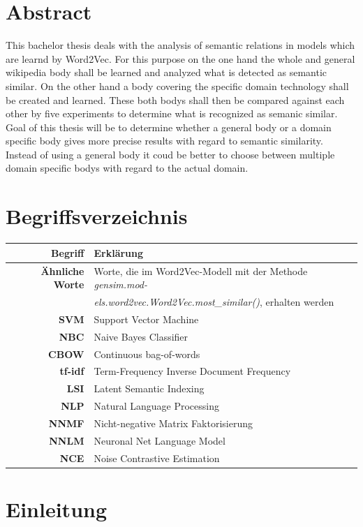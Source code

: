 \documentclass[12pt,a4paper]{report}
\begin{document}
\chapter*{Abstract}
This bachelor thesis deals with the analysis of semantic relations in models which are learnd by Word2Vec.
For this purpose on the one hand the whole and general wikipedia body shall be learned and analyzed what is detected as semantic similar. On the other hand a body covering the specific domain technology shall be created and learned.
These both bodys shall then be compared against each other by five experiments to determine what is recognized as semanic similar.\\
Goal of this thesis will be to determine whether a general body or a domain specific body gives more precise results with regard to semantic similarity. Instead of using a general body it coud be better to choose between multiple domain specific bodys with regard to the actual domain.

\newpage
\tableofcontents
\newpage
\chapter*{Begriffsverzeichnis}
	\begin{tabular}{r|l}	
	\textbf{Begriff} & Erklärung\\
	\hline	
	\textbf{Ähnliche Worte} & Worte, die im Word2Vec-Modell mit der Methode \textit{gensim.mod-}\\
	&  \textit{els.word2vec.Word2Vec.most\_similar()}, erhalten werden\\
	\textbf{SVM} & Support Vector Machine\\
	\textbf{NBC} & Naive Bayes Classifier\\
	\textbf{CBOW} & Continuous bag-of-words\\
	\textbf{tf-idf} & Term-Frequency Inverse Document Frequency\\
	\textbf{LSI} & Latent Semantic Indexing\\
	\textbf{NLP} & Natural Language Processing\\
	\textbf{NNMF} & Nicht-negative Matrix Faktorisierung\\
	\textbf{NNLM} & Neuronal Net Language Model\\
	\textbf{NCE} & Noise Contrastive Estimation\\
	

\end{tabular}
\newpage
{}
\chapter{Einleitung}
\end{document}
